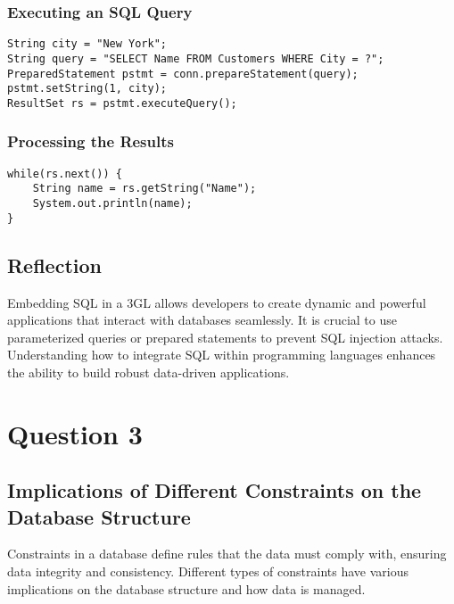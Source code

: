 \documentclass[12pt]{article}
\begin{document}
\subsubsection*{Executing an SQL Query}

\begin{lstlisting}[style=JavaStyle]
String city = "New York";
String query = "SELECT Name FROM Customers WHERE City = ?";
PreparedStatement pstmt = conn.prepareStatement(query);
pstmt.setString(1, city);
ResultSet rs = pstmt.executeQuery();
\end{lstlisting}

\subsubsection*{Processing the Results}

\begin{lstlisting}[style=JavaStyle]
while(rs.next()) {
    String name = rs.getString("Name");
    System.out.println(name);
}
\end{lstlisting}

\subsection*{Reflection}

Embedding SQL in a 3GL allows developers to create dynamic and powerful applications that interact with databases seamlessly. It is crucial to use parameterized queries or prepared statements to prevent SQL injection attacks. Understanding how to integrate SQL within programming languages enhances the ability to build robust data-driven applications.

\newpage

\section*{Question 3}


\subsection*{Implications of Different Constraints on the Database Structure}

Constraints in a database define rules that the data must comply with, ensuring data integrity and consistency. Different types of constraints have various implications on the database structure and how data is managed.
\end{document}
